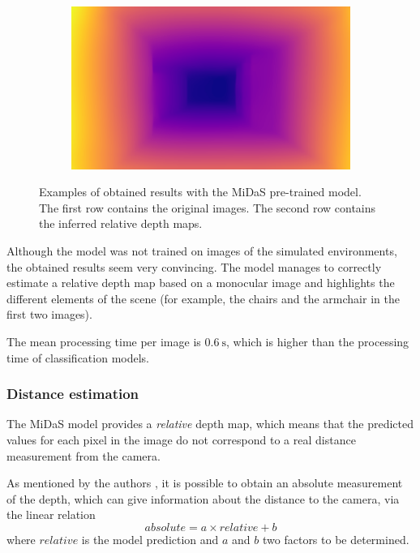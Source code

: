 \begin{figure}[H]
\begin{subfigure}{0.32\textwidth}
    \end{subfigure}
    \hfill
    \begin{subfigure}{0.32\textwidth}
        \centering
        \includegraphics[width=\textwidth]{resources/png/06/depth/results/2.png}
    \end{subfigure}
    \caption{Examples of obtained results with the MiDaS pre-trained model. The first row contains the original images. The second row contains the inferred relative depth maps.}
    \label{fig:06.depth.results.examples}
\end{figure}

Although the model was not trained on images of the simulated environments, the obtained results seem very convincing. The model manages to correctly estimate a relative depth map based on a monocular image and highlights the different elements of the scene (for example, the chairs and the armchair in the first two images).

The mean processing time per image is $\SI{0.6}{\second}$, which is higher than the processing time of classification models.

\subsubsection{Distance estimation}

The MiDaS model provides a \emph{relative} depth map, which means that the predicted values for each pixel in the image do not correspond to a real distance measurement from the camera.

As mentioned by the authors \cite{github2020midasdepth}, it is possible to obtain an absolute measurement of the depth, which can give information about the distance to the camera, via the linear relation
\begin{equation}
    absolute = a \times relative + b
\end{equation}
where $relative$ is the model prediction and $a$ and $b$ two factors to be determined.

